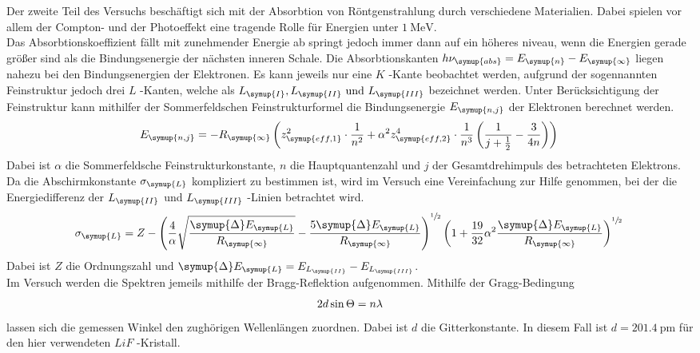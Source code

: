 \newpage
Der zweite Teil des Versuchs beschäftigt sich mit der Absorbtion von Röntgenstrahlung durch
verschiedene Materialien. Dabei spielen vor allem der Compton- und der Photoeffekt eine
tragende Rolle für Energien unter $\SI{1}{\mega\electronvolt}$.\\
Das Absorbtionskoeffizient fällt mit zunehmender Energie ab springt jedoch immer dann
auf ein höheres niveau, wenn die Energien gerade größer sind als die Bindungsenergie der
nächsten inneren Schale. Die Absorbtionskanten $h\nu_\symup{abs} = E_\symup{n} - E_\symup{\infty}$
liegen nahezu bei den Bindungsenergien der Elektronen. Es kann jeweils nur eine $K$ -Kante
beobachtet werden, aufgrund der sogennannten Feinstruktur jedoch drei $L$ -Kanten,
welche als $L_\symup{I},L_\symup{II} \text{ und } L_\symup{III}$
bezeichnet werden. Unter Berücksichtigung der Feinstruktur kann mithilfer der
Sommerfeldschen Feinstrukturformel die Bindungsenergie $E_\symup{n,j}$ der Elektronen
berechnet werden.
\begin{equation}
  E_\symup{n,j} = -R_\symup{\infty} \left(z_\symup{eff,1}^2 \cdot \dfrac{1}{n^2}
  + \alpha^2 z_\symup{eff,2}^4 \cdot \dfrac{1}{n^3}\left(\dfrac{1}{j+\frac{1}{2}}-
  \dfrac{3}{4n}\right)\right)
  \label{eqn:E_n,j}\\
\end{equation}
Dabei ist $\alpha$ die Sommerfeldsche Feinstrukturkonstante, $n$ die Hauptquantenzahl und
$j$ der Gesamtdrehimpuls des betrachteten Elektrons. Da die Abschirmkonstante $\sigma_\symup{L}$
kompliziert zu bestimmen ist, wird im Versuch eine Vereinfachung zur Hilfe genommen,
bei der die Energiedifferenz der $L_\symup{II}$ und $L_\symup{III}$ -Linien betrachtet wird.
\begin{equation}
  \sigma_\symup{L} = Z - \left(\dfrac{4}{\alpha}\sqrt{\dfrac{\symup{\Delta} E_\symup{L}}{R_\symup{\infty}}}
  - \dfrac{5 \symup{\Delta} E_\symup{L} }{R_\symup{\infty}} \right)^{\sfrac{1}{2}}
  \left(1 + \dfrac{19}{32} \alpha^2 \dfrac{\symup{\Delta} E_\symup{L}}{R_\symup{\infty}} \right)^{\sfrac{1}{2}}
  \label{eqn:sigma_L}\\
\end{equation}
Dabei ist $Z$ die Ordnungszahl und $\symup{\Delta} E_\symup{L} = E_{L_\symup{II}} -E_{L_\symup{III}}$.\\
Im Versuch werden die Spektren jemeils mithilfe der Bragg-Reflektion aufgenommen. Mithilfe
der Gragg-Bedingung
\begin{equation}
  2 d \sin{\Theta} = n \lambda
  \label{eqn:bragg}\\
\end{equation}
lassen sich die gemessen Winkel den zughörigen Wellenlängen zuordnen. Dabei ist $d$ die
Gitterkonstante. In diesem Fall ist $d = \SI{201.4}{\pico\meter}$ für den hier verwendeten
$LiF$ -Kristall.\\
